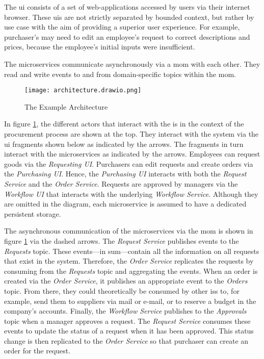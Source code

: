 The \gls{ui} consists of a set of web-applications accessed by users via their internet browser.
These \glspl{ui} are not strictly separated by bounded context, but rather by use case with the aim of providing a superior user experience.
For example, purchaser's may need to edit an employee's request to correct descriptions and prices, because the employee's initial inputs were insufficient.

The microservices communicate asynchronously via a \gls{mom} with each other.
They read and write events to and from domain-specific topics within the \gls{mom}.

\begin{figure}[H]
  \centering
  \texttt{[image: architecture.drawio.png]}
  \caption{The Example Architecture}\label{fig:example-architecture}
\end{figure}

In figure \ref{fig:example-architecture}, the different actors that interact with the \gls{is} in the context of the procurement process are shown at the top.
They interact with the system via the \gls{ui} fragments shown below as indicated by the arrows.
The fragments in turn interact with the microservices as indicated by the arrows.
Employees can request goods via the \emph{Requesting UI}.
Purchasers can edit requests and create orders via the \emph{Purchasing UI}.
Hence, the \emph{Purchasing UI} interacts with both the \emph{Request Service} and the \emph{Order Service}.
Requests are approved by managers via the \emph{Workflow UI} that interacts with the underlying \emph{Workflow Service}.
Although they are omitted in the diagram, each microservice is assumed to have a dedicated persistent storage.

The asynchronous communication of the microservices via the \gls{mom} is shown in figure \ref{fig:example-architecture} via the dashed arrows.
The \emph{Request Service} publishes events to the \emph{Requests} topic.
These events---in sum---contain all the information on all requests that exist in the system.
Therefore, the \emph{Order Service} replicates the requests by consuming from the \emph{Requests} topic and aggregating the events.
When an order is created via the \emph{Order Service}, it publishes an appropriate event to the \emph{Orders} topic.
From there, they could theoretically be consumed by other \glspl{is} to, for example, send them to suppliers via mail or e-mail, or to reserve a budget in the company's accounts.
Finally, the \emph{Workflow Service} publishes to the \emph{Approvals} topic when a manager approves a request.
The \emph{Request Service} consumes these events to update the status of a request when it has been approved.
This status change is then replicated to the \emph{Order Service} so that purchaser can create an order for the request.

